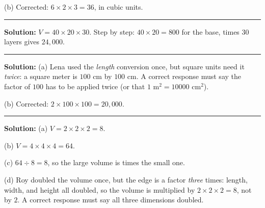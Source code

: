 \documentclass[12pt]{article}
\begin{document}
(b) Corrected: $6 \times 2 \times 3 = 36$, in cubic units.

\vspace{0.2cm}\noindent\rule{\linewidth}{0.2pt}\vspace{0.1cm}


\textbf{Solution:} $V = 40 \times 20 \times 30$. Step by step:
$40 \times 20 = 800$ for the base, times $30$ layers gives $24{,}000$.

\vspace{0.2cm}\noindent\rule{\linewidth}{0.2pt}\vspace{0.1cm}


\textbf{Solution:}
(a) Lena used the \emph{length} conversion once, but square units need it
\emph{twice}: a square meter is $100$ cm by $100$ cm. A correct response
must say the factor of $100$ has to be applied twice (or that
$1$ m$^2 = 10000$ cm$^2$).

(b) Corrected: $2 \times 100 \times 100 = 20{,}000$.

\vspace{0.2cm}\noindent\rule{\linewidth}{0.2pt}\vspace{0.1cm}


\textbf{Solution:}
(a) $V = 2 \times 2 \times 2 = 8$. 

(b) $V = 4 \times 4 \times 4 = 64$. 

(c) $64 \div 8 = 8$, so the large volume is  times the small one.

(d) Roy doubled the volume once, but the edge is a factor \emph{three}
times: length, width, and height all doubled, so the volume is multiplied by
$2 \times 2 \times 2 = 8$, not by $2$. A correct response must say all three
dimensions doubled.
\end{document}
